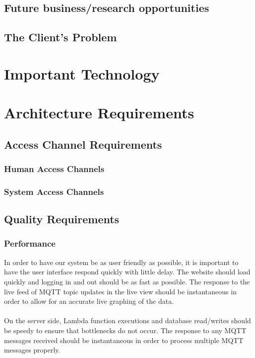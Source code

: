 \documentclass{article}
\begin{document}
\subsection{Future business/research opportunities}

\subsection{The Client's Problem}

\section{Important Technology}

\section{Architecture Requirements}

\subsection{Access Channel Requirements}

\subsubsection{Human Access Channels}

\subsubsection{System Access Channels}

	\subsection{Quality Requirements}
		\subsubsection{Performance}
			In order to have our system be as user friendly as possible, it is important to have the user interface respond quickly with little delay. The website should load quickly and logging in and out should be as fast as possible. The response to the live feed of MQTT topic updates in the live view should be instantaneous in order to allow for an accurate live graphing of the data.
				\\\\		
			On the server side, Lambda function executions and database read/writes should be speedy to ensure that bottlenecks do not occur. The response to any MQTT messages received should be instantaneous in order to process multiple MQTT messages properly.
			
\end{document}
